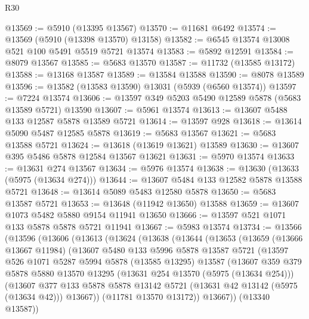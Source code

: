 \begin{lexlean}{R30}
\begin{coremodule}
@13569 := @5910 (@13395 @13567)
@13570 := @11681 @6492
@13574 := @13569 (@5910 (@13398 @13570) @13158)
@13582 := @6545 @13574 @13008 @521 @100 @5491 @5519 @5721 @13574
@13583 := @5892 @12591
@13584 := @8079 @13567
@13585 := @5683 @13570
@13587 := @11732 (@13585 @13172)
@13588 := @13168 @13587
@13589 := @13584 @13588
@13590 := @8078 @13589
@13596 := @13582 (@13583 @13590) @13031 (@5939 (@6560 @13574))
@13597 := @7224 @13574
@13606 := @13597 @349 @5203 @5490 @12589 @5878 (@5683 @13589 @5721) @13590
@13607 := @5961 @13574
@13613 := @13607 @5488 @133 @12587 @5878 @13589 @5721
@13614 := @13597 @928
@13618 := @13614 @5090 @5487 @12585 @5878
@13619 := @5683 @13567
@13621 := @5683 @13588 @5721
@13624 := @13618 (@13619 @13621) @13589
@13630 := @13607 @395 @5486 @5878 @12584 @13567 @13621
@13631 := @5970 @13574
@13633 := @13631 @274 @13567
@13634 := @5976 @13574
@13638 := @13630 (@13633 (@5975 (@13634 @274)))
@13644 := @13607 @5484 @133 @12582 @5878 @13588 @5721
@13648 := @13614 @5089 @5483 @12580 @5878
@13650 := @5683 @13587 @5721
@13653 := @13648 (@11942 @13650) @13588
@13659 := @13607 @1073 @5482 @5880 @9154 @11941 @13650
@13666 := @13597 @521 @1071 @133 @5878 @5878 @5721 @11941
@13667 := @5983 @13574
@13734 := @13566
    (@13596
      (@13606
        (@13613
          (@13624
            (@13638
              (@13644
                (@13653
                  (@13659
                    (@13666 @13667 @11984)
                    (@13607
                      @5480
                      @133
                      @5996
                      @5878
                      @13587
                      @5721
                      (@13597
                        @526
                        @1071
                        @5287
                        @5994
                        @5878
                        (@13585 @13295)
                        @13587
                        (@13607
                          @359
                          @379
                          @5878
                          @5880
                          @13570
                          @13295
                          (@13631 @254 @13570 (@5975 (@13634 @254)))
                          (@13607
                            @377
                            @133
                            @5878
                            @5878
                            @13142
                            @5721
                            (@13631 @42 @13142 (@5975 (@13634 @42)))
                            @13667))
                        (@11781 @13570 @13172))
                      @13667))
                  (@13340 @13587))

\end{coremodule}
\end{lexlean}
